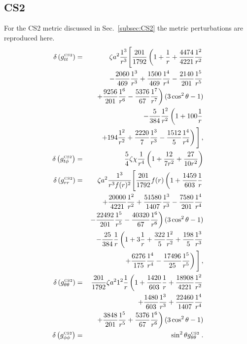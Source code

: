 \subsection{CS2}\label{subsec:CS2components}
For the CS2 metric discussed in Sec.\ \ref{subsec:CS2} the metric perturbations are reproduced here.
\begin{eqnarray}
\delta\left(g_{tt}^{\mbox{\tiny CS2}} \right) &=& \zeta a^2 \frac{1^3}{r^3} \Bigg[  \frac{201}{1792} \left( 1+\frac{1}{r} +\frac{4474}{4221} \frac{1^2}{r^2} \right.\nonumber\\
&&\left.-\frac{2060}{469} \frac{1^3}{r^3}+\frac{1500}{469} \frac{1^4}{r^4} - \frac{2140}{201} \frac{1^5}{r^5}  \right.\nonumber \\
&&\left.+ \frac{9256}{201} \frac{1^6}{r^6}- \frac{5376}{67} \frac{1^7}{r^7}  \right) (3\cos^2 \theta -1)  \nonumber \\
&&- \frac{5}{384} \frac{1^2}{r^2} \left( 1 + 100 \frac{1}{r} \right.\nonumber\\
&&\left.+ 194\frac{1^2}{r^2} + \frac{2220}{7} \frac{1^3}{r^3} - \frac{1512}{5} \frac{1^4}{r^4} \right) \Bigg]    \,, 
\\
\delta\left(g_{t\phi}^{\mbox{\tiny CS2}} \right) &=& \frac{5}{4}\zeta\chi\frac{1}{r^{4}}\left(1+\frac{12}{7r^{2}}+\frac{27}{10r^{2}}\right)
\\
\delta\left(g_{rr}^{\mbox{\tiny CS2}} \right) &=&   \zeta a^2 \frac{1^3}{r^3 f(r)^2} \Bigg[  \frac{201}{1792}  f(r) \left( 1+ \frac{1459}{603} \frac{1}{r} \right.\nonumber\\
&&\left. +\frac{20000}{4221} \frac{1^2}{r^2}+\frac{51580}{1407} \frac{1^3}{r^3} -\frac{7580}{201} \frac{1^4}{r^4} \right. \nonumber \\ 
& & \left. - \frac{22492}{201} \frac{1^5}{r^5}  - \frac{40320}{67} \frac{1^6}{r^6} \right) (3 \cos^2 \theta -1)   \nonumber \\
& & - \frac{25}{384} \frac{1}{r} \left( 1 + 3\frac{1}{r} + \frac{322}{5} \frac{1^2}{r^2} + \frac{198}{5} \frac{1^3}{r^3} \right.\nonumber\\
&&\left.+ \frac{6276}{175} \frac{1^4}{r^4} - \frac{17496}{25} \frac{1^5}{r^5}   \right) \Bigg]  \,,
\\
\delta\left(g_{\theta\theta}^{\mbox{\tiny CS2}} \right) &=& \frac{201}{1792} \zeta a^2 1^2 \frac{1}{r} \left( 1 + \frac{1420}{603} \frac{1}{r} + \frac{18908}{4221} \frac{1^2}{r^2} \right. \nonumber \\
& & \left. + \frac{1480}{603} \frac{1^3}{r^3}+ \frac{22460}{1407} \frac{1^4}{r^4} \right.\nonumber\\
&&\left.+ \frac{3848}{201} \frac{1^5}{r^5} + \frac{5376}{67} \frac{1^6}{r^6} \right) (3 \cos^2 \theta -1)
\\
\delta\left(g_{\phi\phi}^{\mbox{\tiny CS2}} \right) &=&  \sin^2 \theta g_{\theta\theta}^{\mbox{\tiny CS2}} \; .
\end{eqnarray}

